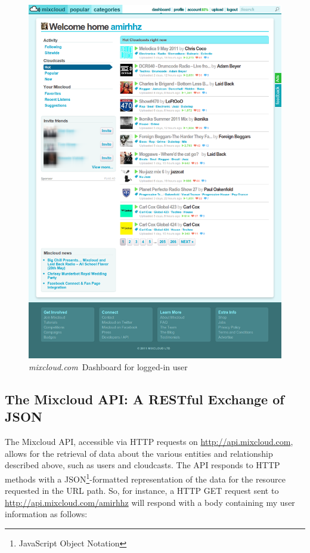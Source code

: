 \documentclass[a4paper,12pt,twoside,notitlepage]{report}
\def\mixurl{\emph{mixcloud.com}}
\begin{document}
\begin{figure}
 \centering
 \includegraphics[width=\textwidth]{./images/mixcloud-dashb.png}
 \caption{\mixurl\ Dashboard for logged-in user}
 \label{fig:mix-dash}
\end{figure}

\subsection{The Mixcloud API: A RESTful Exchange of JSON}

The Mixcloud API, accessible via HTTP requests on \url{http://api.mixcloud.com},
allows for the retrieval of data about the various entities and relationship
described above, such as users and cloudcasts. The API responds to HTTP methods
with a JSON\footnote{JavaScript Object Notation}-formatted representation of
the data for the resource requested in the URL path. So, for instance, a HTTP
GET request sent to \url{http://api.mixcloud.com/amirhhz} will respond with a
body containing my user information as follows:
\end{document}
